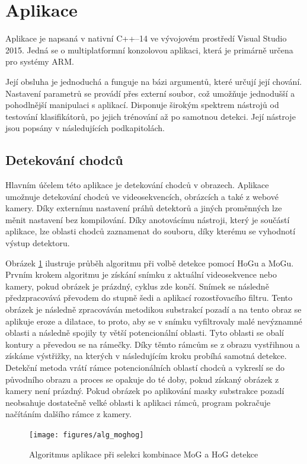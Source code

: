 \section{Aplikace}
Aplikace je napsaná v nativní C++--14 ve vývojovém prostředí Visual Studio 2015. Jedná se o multiplatformní konzolovou aplikaci, která je primárně určena pro systémy ARM. 

Její obsluha je jednoduchá a funguje na bázi argumentů, které určují její chování. Nastavení parametrů se provádí přes externí soubor, což umožňuje jednodušší a pohodlnější manipulaci s aplikací. Disponuje širokým spektrem nástrojů od testování klasifikátorů, po jejich trénování až po samotnou detekci. Její nástroje jsou popsány v následujících podkapitolách.

\subsection{Detekování chodců}
Hlavním účelem této aplikace je detekování chodců v obrazech. Aplikace umožnuje detekování chodců ve videosekvencích, obrázcích a také z webové kamery. Díky externímu nastavení práhů detektorů a jiných proměnných lze měnit nastavení bez kompilování. Díky anotovácímu nástroji, který je součástí aplikace, lze oblasti chodců zaznamenat do souboru, díky kterému se vyhodnotí výstup detektoru.
 
Obrázek \ref{mog_algorithm} ilustruje průběh algoritmu při volbě detekce pomocí HoGu a MoGu. Prvním krokem algoritmu je získání snímku z aktuální videosekvence nebo kamery, pokud obrázek je prázdný, cyklus zde končí. Snímek se následně předzpracovává převodem do stupně šedi a aplikací rozostřovacího filtru. Tento obrázek je následně zpracováván metodikou substrakcí pozadí a na tento obraz se aplikuje eroze a dilatace, to proto, aby se v snímku vyfiltrovaly malé nevýznamné oblasti a následně spojily ty větší potencionální oblasti. Tyto oblasti se obalí kontury a převedou se na rámečky. Díky těmto rámcům se z obrazu vystřihnou a získáme výstřižky, na kterých v následujícím kroku probíhá samotná detekce. Detekční metoda vrátí rámce potencionálních oblastí chodců a vykreslí se do původního obrazu a proces se opakuje do té doby, pokud získaný obrázek z kamery není prázdný. Pokud obrázek po aplikování masky substrakce pozadí neobsahuje dostatečně velké oblasti k aplikaci rámců, program pokračuje načítáním dalšího rámce z kamery.  

\begin{figure}[H]
\centering
\texttt{[image: figures/alg\_moghog]}
\caption{Algoritmus aplikace při selekci kombinace MoG a HoG detekce}
\label{mog_algorithm}
\end{figure}

